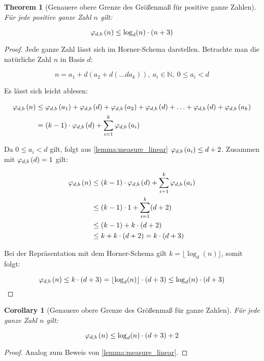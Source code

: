 \documentclass{article}
\newtheorem{theorem}{Theorem}[section]
\newtheorem{corollary}{Corollary}[theorem]
\theoremstyle{nonumberplain}
\newtheorem{proof}{Beweis}
\begin{document}
\begin{theorem}[Genauere obere Grenze des Größenmaß für positive ganze Zahlen]
    Für jede positive ganze Zahl \(n\) gilt:
    
        \[\varphi_{d,b}\left(n\right) \leq \log_d(n) \cdot (n+3)\]
\end{theorem}
\begin{proof}
    Jede ganze Zahl lässt sich im Horner-Schema darstellen.
    Betrachte man die natürliche Zahl \(n\) in Basis \(d\):

        \[n = a_1 + d (a_2 + d (\ldots d a_k)),\ a_i\in\mathbb{N},\ 0 \leq a_i < d\]

    Es lässt sich leicht ablesen:

    \begin{align*}
        \varphi_{d,b}\left(n\right) 
        &\leq \varphi_{d,b}\left(a_1\right) + \varphi_{d,b}\left(d\right) + \varphi_{d,b}\left(a_2\right) + \varphi_{d,b}\left(d\right) + \ldots + \varphi_{d,b}\left(d\right) + \varphi_{d,b}\left(a_k\right) \\
        &= (k-1)\cdot\varphi_{d,b}\left(d\right) + \sum_{i=1}^k \varphi_{d,b}\left(a_i\right)
    \end{align*}
    
    Da \(0 \leq a_i < d\) gilt, folgt aus \ref{lemma:measure_linear} \(\varphi_{d,b}\left(a_i\right) \leq d + 2\).
    Zusammen mit \(\varphi_{d,b}\left(d\right) = 1\) gilt:

    \begin{align*}
        \varphi_{d,b}\left(n\right) 
        &\leq (k-1) \cdot \varphi_{d,b}\left(d\right) + \sum_{i=1}^k \varphi_{d,b}\left(a_i\right) \\
        &\leq (k-1) \cdot 1 + \sum_{i=1}^k (d+2) \\
        &\leq (k-1) + k \cdot (d+2) \\
        &\leq k + k \cdot (d+2) = k \cdot (d+3) \\
    \end{align*}
    
    Bei der Repräsentation mit dem Horner-Schema gilt \(k = \lfloor \log_d(n) \rfloor\), somit folgt:

        \[\varphi_{d,b}\left(n\right) \leq k \cdot (d+3) = \lfloor \log_d(n) \rfloor \cdot (d+3) \leq \log_d(n) \cdot (d+3)\]
\end{proof}

\begin{corollary}[Genauere obere Grenze des Größenmaß für ganze Zahlen]\label{corollary:phi_bound}
    Für jede ganze Zahl \(n\) gilt:
    
        \[\varphi_{d,b}\left(n\right) \leq \log_d(n) \cdot (d+3) + 2\]
\end{corollary}
\begin{proof}
    Analog zum Beweis von \ref{lemma:measure_linear}.
\end{proof}
\end{document}
